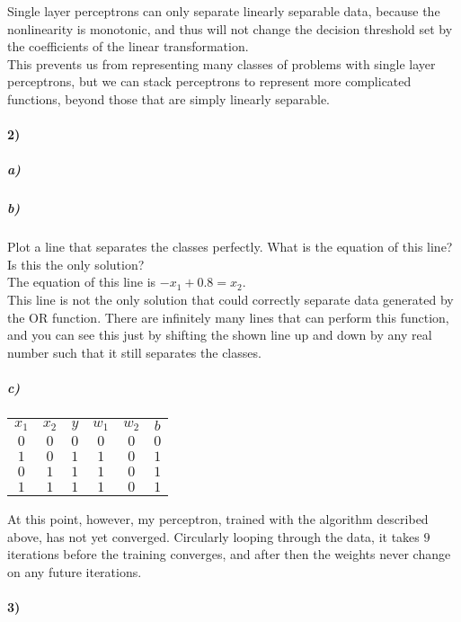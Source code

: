 \documentclass[10pt,letter]{article}
\begin{document}
Single layer perceptrons can only separate linearly separable data, because the nonlinearity is 
monotonic, and thus will not change the decision threshold set by the coefficients of the linear 
transformation.\\

This prevents us from representing many classes of problems with single layer perceptrons, but 
we can stack perceptrons to represent more complicated functions, beyond those that are simply 
linearly separable.

\paragraph{2)}

\subparagraph{a)}
\subparagraph{b)} Plot a line that separates the classes perfectly.  What is the equation of this 
line? Is this the only solution?\\

The equation of this line is $-x_1 + 0.8 = x_2$.\\

This line is not the only solution that could correctly separate data generated by the OR function.  There are infinitely many lines that can perform this function, and you can see this just by shifting the shown line up and down by any real number such that it still separates the classes.

\subparagraph{c)}

\begin{center}
    \begin{tabular}{ |c|c|c|c|c|c| } 
         \hline
          $x_1$ & $x_2$ & $y$ & $w_1$ & $w_2$ & $b$\\ 
          $0$ & $0$ & $0$ & $0$ & $0$ & $0$\\ 
          $1$ & $0$ & $1$ & $1$ & $0$ & $1$\\ 
          $0$ & $1$ & $1$ & $1$ & $0$ & $1$\\ 
          $1$ & $1$ & $1$ & $1$ & $0$ & $1$\\ 
          \hline
      \end{tabular}
  \end{center}

At this point, however, my perceptron, trained with the algorithm described above, has not yet 
converged.  Circularly looping through the data, it takes $9$ iterations before the training 
converges, and after then the weights never change on any future iterations.

\paragraph{3)}
\end{document}
